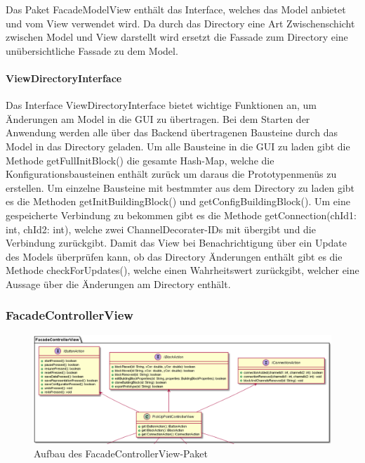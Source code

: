 \documentclass[parskip=full]{scrartcl}
\begin{document}
Das Paket FacadeModelView enthält das Interface, welches das Model anbietet und vom View verwendet wird. Da durch das Directory eine Art Zwischenschicht zwischen Model und View darstellt wird ersetzt die Fassade zum Directory eine unübersichtliche Fassade zu dem Model. 

\paragraph{ViewDirectoryInterface}

Das Interface ViewDirectoryInterface bietet wichtige Funktionen an, um Änderungen am Model in die GUI zu übertragen. 
Bei dem Starten der Anwendung werden alle über das Backend übertragenen Bausteine durch das Model in das Directory geladen. Um alle Bausteine in die GUI zu laden gibt die Methode getFullInitBlock() die gesamte Hash-Map, welche die Konfigurationsbausteinen enthält zurück um daraus die Prototypenmenüs zu erstellen. Um einzelne Bausteine mit bestmmter aus dem Directory zu laden gibt es die Methoden getInitBuildingBlock() und getConfigBuildingBlock(). Um eine gespeicherte Verbindung zu bekommen gibt es die Methode getConnection(chId1: int, chId2: int), welche zwei ChannelDecorater-IDs mit übergibt und die Verbindung zurückgibt.
Damit das View bei Benachrichtigung über ein Update des Models überprüfen kann, ob das Directory Änderungen enthält gibt es die Methode checkForUpdates(), welche einen Wahrheitswert zurückgibt, welcher eine Aussage über die Änderungen am Directory enthält.

\clearpage

\subsubsection{FacadeControllerView}

\begin{figure}[htbp]
	\begin{center}
		\includegraphics[width = 14 cm]{Grafiken/View/FacadeControllerViewNamespace.png}
		\caption{Aufbau des FacadeControllerView-Paket}
		\label{Entwurf_Grob}
	\end{center}
\end{figure}
\end{document}
